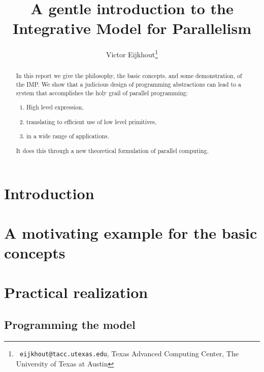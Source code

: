 \documentclass[11pt,fleqn,preprint]{impreport}
\title[IMP introduction]{A gentle introduction to the Integrative Model for Parallelism}
\author[Eijkhout]{Victor Eijkhout\thanks{{\tt
      eijkhout@tacc.utexas.edu}, Texas Advanced Computing Center, The
    University of Texas at Austin}}
\begin{document}
\maketitle

\begin{abstract}
In this report we give the philosophy, the basic concepts,
and some demonstration, of the \acf{IMP}.
We show that a judicious design of programming abstractions
can lead to a system that accomplishes the holy grail of parallel programming:
\begin{enumerate}
\item High level expression,
\item translating to efficient use of low level primitives,
\item in a wide range of applications.
\end{enumerate}
It does this through a new theoretical formulation of parallel computing.
\end{abstract}

\acresetall

\section{Introduction}


\section{A motivating example for the basic concepts}
\label{imp11example}



\section{Practical realization}
\label{sec:realization}

\subsection{Programming the model}


\end{document}
